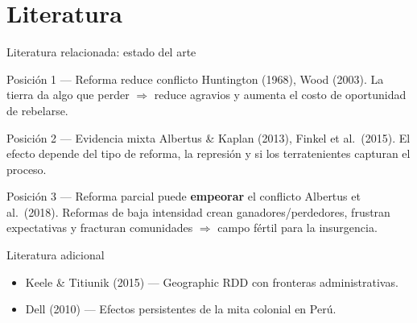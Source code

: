 \documentclass[aspectratio=169,t]{beamer}
\newcommand{\hl}[1]{\textcolor{azulmedio}{\textbf{#1}}}
\begin{document}
\section{Literatura}

\begin{frame}{Literatura relacionada: estado del arte}
\small
\begin{block}{Posici\'on 1 --- Reforma reduce conflicto}
Huntington (1968), Wood (2003). La tierra da algo que
perder $\Rightarrow$ reduce agravios y aumenta el costo
de oportunidad de rebelarse.
\end{block}
\vspace{0.09cm}
\begin{block}{Posici\'on 2 --- Evidencia mixta}
Albertus \& Kaplan (2013), Finkel et al.\ (2015).
El efecto depende del tipo de reforma, la represi\'on y
si los terratenientes capturan el proceso.
\end{block}
\vspace{0.09cm}
\begin{alertblock}{Posici\'on 3 --- Reforma parcial puede
    \hl{empeorar} el conflicto}
Albertus et al.\ (2018). Reformas de baja intensidad
crean ganadores/perdedores, frustran expectativas y
fracturan comunidades $\Rightarrow$ campo f\'ertil para
la insurgencia.
\end{alertblock}
\vspace{0.09cm}
\begin{exampleblock}{Literatura adicional}
\begin{itemize}
  \item Keele \& Titiunik (2015) ---
        Geographic RDD con fronteras administrativas.
  \item Dell (2010) ---
        Efectos persistentes de la mita colonial en Per\'u.
\end{itemize}
\end{exampleblock}
\end{frame}
\end{document}
